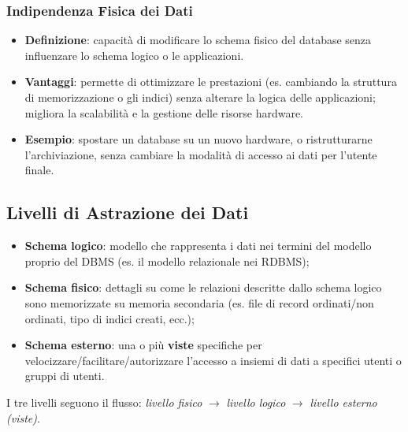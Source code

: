 \documentclass[12pt, a4paper]{article}
\begin{document}
\subsubsection{Indipendenza Fisica dei Dati}
\begin{itemize}
    \item \textbf{Definizione}: capacità di modificare lo schema fisico del database senza influenzare lo schema logico o le applicazioni.
    \item \textbf{Vantaggi}: permette di ottimizzare le prestazioni (es. cambiando la struttura di memorizzazione o gli indici) senza alterare la logica delle applicazioni; migliora la scalabilità e la gestione delle risorse hardware.
    \item \textbf{Esempio}: spostare un database su un nuovo hardware, o ristrutturarne l'archiviazione, senza cambiare la modalità di accesso ai dati per l'utente finale.
\end{itemize}

\subsection{Livelli di Astrazione dei Dati}

\begin{itemize}
    \item \textbf{Schema logico}: modello che rappresenta i dati nei termini del modello proprio del DBMS (es. il modello relazionale nei RDBMS);
    \item \textbf{Schema fisico}: dettagli su come le relazioni descritte dallo schema logico sono memorizzate su memoria secondaria (es. file di record ordinati/non ordinati, tipo di indici creati, ecc.);
    \item \textbf{Schema esterno}: una o più \textbf{viste} specifiche per velocizzare/facilitare/autorizzare l'accesso a insiemi di dati a specifici utenti o gruppi di utenti.
\end{itemize}

I tre livelli seguono il flusso: \textit{livello fisico} $\rightarrow$ \textit{livello logico} $\rightarrow$ \textit{livello esterno (viste)}.
\end{document}
